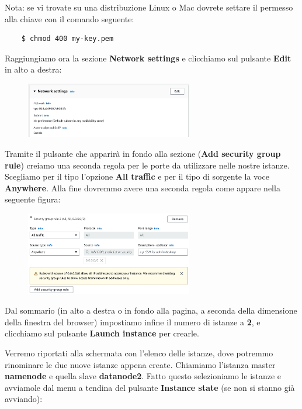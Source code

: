 Nota: se vi trovate su una distribuzione Linux o Mac dovrete settare il permesso alla chiave con il comando seguente:

\begin{verbatim}
    $ chmod 400 my-key.pem
\end{verbatim}

Raggiungiamo ora la sezione \textbf{Network settings} e clicchiamo sul pulsante \textbf{Edit} in alto a destra:

\begin{figure}[H]
    \centering
    \includegraphics[width=0.65\textwidth]{images/network.png}
\end{figure}

Tramite il pulsante che apparirà in fondo alla sezione (\textbf{Add security group rule}) creiamo una seconda regola per le porte da utilizzare nelle nostre istanze. Scegliamo per il tipo l'opzione \textbf{All traffic} e per il tipo di sorgente la voce \textbf{Anywhere}. Alla fine dovremmo avere una seconda regola come appare nella seguente figura:

\begin{figure}[H]
    \centering
    \includegraphics[width=0.65\textwidth]{images/security-rule.png}
\end{figure}

Dal sommario (in alto a destra o in fondo alla pagina, a seconda della dimensione della finestra del browser) impostiamo infine il numero di istanze a \textbf{2}, e clicchiamo sul pulsante \textbf{Launch instance} per crearle.

Verremo riportati alla schermata con l'elenco delle istanze, dove potremmo rinominare le due nuove istanze appena create. Chiamiamo l'istanza master \textbf{namenode} e quella slave \textbf{datanode2}. Fatto questo selezioniamo le istanze e avviamole dal menu a tendina del pulsante \textbf{Instance state} (se non si stanno già avviando):


